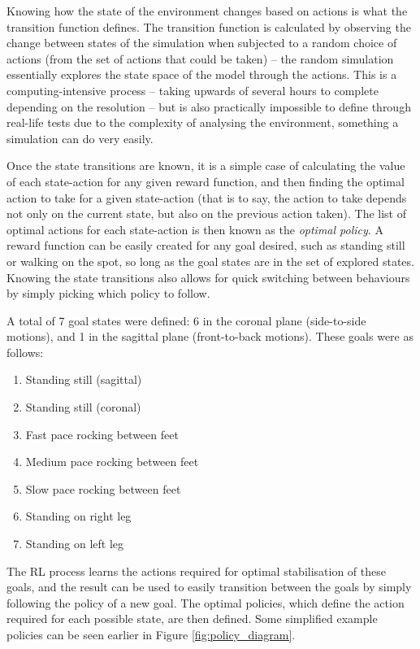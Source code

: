 Knowing how the state of the environment changes based on actions is what the transition function defines. The transition function is calculated by observing the change between states of the simulation when subjected to a random choice of actions (from the set of actions that could be taken) -- the random simulation essentially explores the state space of the model through the actions. This is a computing-intensive process -- taking upwards of several hours to complete depending on the resolution -- but is also practically impossible to define through real-life tests due to the complexity of analysing the environment, something a simulation can do very easily.

Once the state transitions are known, it is a simple case of calculating the value of each state-action for any given reward function, and then finding the optimal action to take for a given state-action (that is to say, the action to take depends not only on the current state, but also on the previous action taken). The list of optimal actions for each state-action is then known as the \textit{optimal policy}. A reward function can be easily created for any goal desired, such as standing still or walking on the spot, so long as the goal states are in the set of explored states. Knowing the state transitions also allows for quick switching between behaviours by simply picking which policy to follow.

A total of 7 goal states were defined: 6 in the coronal plane (side-to-side motions), and 1 in the sagittal plane (front-to-back motions). These goals were as follows:

\begin{enumerate}
\item Standing still (sagittal)
\item Standing still (coronal)
\item Fast pace rocking between feet
\item Medium pace rocking between feet
\item Slow pace rocking between feet
\item Standing on right leg
\item Standing on left leg
\end{enumerate}

The RL process learns the actions required for optimal stabilisation of these goals, and the result can be used to easily transition between the goals by simply following the policy of a new goal. The optimal policies, which define the action required for each possible state, are then defined. Some simplified example policies can be seen earlier in Figure \ref{fig:policy_diagram}.


